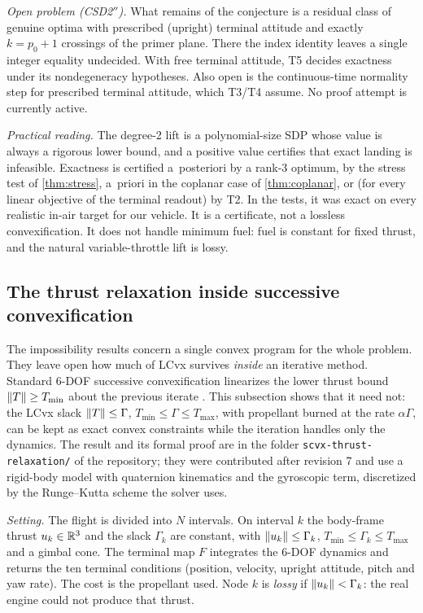 \emph{Open problem (CSD2$''$).} What remains of the conjecture is a residual class of genuine optima with prescribed (upright)
terminal attitude and exactly $k=p_0+1$ crossings of the primer plane. There the index identity leaves a single integer equality
undecided. With free terminal attitude, T5 decides exactness under its nondegeneracy hypotheses. Also open is the continuous-time
normality step for prescribed terminal attitude, which T3/T4 assume. No proof attempt is currently active.

\emph{Practical reading.} The degree-2 lift is a polynomial-size SDP whose value is always a rigorous lower bound, and a
positive value certifies that exact landing is infeasible. Exactness is certified a~posteriori by a rank-3 optimum, by the
stress test of \cref{thm:stress}, a~priori in the coplanar case of \cref{thm:coplanar}, or (for every linear objective of the
terminal readout) by T2. In the tests, it was exact on every realistic in-air target for our vehicle. It is a certificate, not a lossless convexification. It does not handle minimum
fuel: fuel is constant for fixed thrust, and the natural variable-throttle lift is lossy.

\subsection{The thrust relaxation inside successive convexification}\label{sec:scvxslack}
The impossibility results concern a single convex program for the whole problem. They leave open how much of LCvx survives
\emph{inside} an iterative method. Standard 6-DOF successive convexification linearizes the lower thrust bound
$\lVert T\rVert\ge T_{\min}$ about the previous iterate \cite{szmuk2020jgcd}. This subsection shows that it need not: the LCvx slack
$\lVert T\rVert\le\Gamma$, $T_{\min}\le\Gamma\le T_{\max}$, with propellant burned at the rate $\alpha\Gamma$, can be kept as exact convex
constraints while the iteration handles only the dynamics. The result and its formal proof are in the folder
\texttt{scvx-thrust-relaxation/} of the repository; they were contributed after revision 7 and use a rigid-body model with
quaternion kinematics and the gyroscopic term, discretized by the Runge--Kutta scheme the solver uses.

\emph{Setting.} The flight is divided into $N$ intervals. On interval $k$ the body-frame thrust $u_k\in\mathbb{R}^3$ and the slack $\Gamma_k$
are constant, with $\lVert u_k\rVert\le\Gamma_k$, $T_{\min}\le\Gamma_k\le T_{\max}$ and a gimbal cone. The terminal map $F$ integrates the
6-DOF dynamics and returns the ten terminal conditions (position, velocity, upright attitude, pitch and yaw rate). The cost is the
propellant used. Node $k$ is \emph{lossy} if $\lVert u_k\rVert<\Gamma_k$: the real engine could not produce that thrust.

